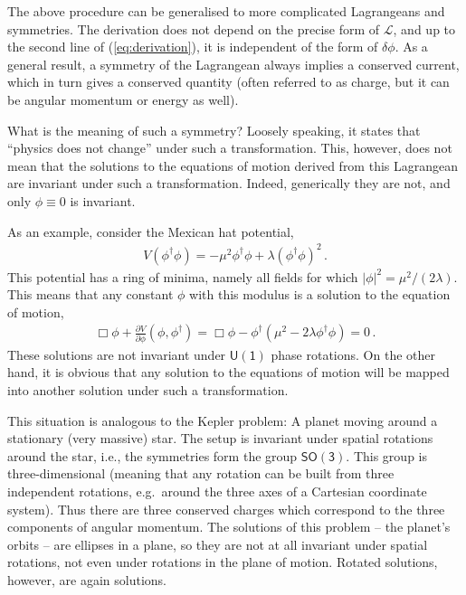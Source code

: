 \documentclass[12pt]{report}
\renewcommand{\L}{\ensuremath{\mathscr{L}}}
\newcommand{\2}{\ensuremath{\sqrt{2}\,}}
\renewcommand{\L}{\ensuremath{\mathscr{L}}}
\begin{document}
{      The above procedure can be generalised to more complicated Lagrangeans and
      symmetries. The derivation does not depend on the precise form of $\L$, and up to the second
      line of (\ref{eq:derivation}), it is independent of the form of $\delta \phi$. As a general
      result, a symmetry of the Lagrangean always implies a conserved current, which in turn gives a
      conserved quantity (often referred to as charge, but it can be angular momentum or energy as
      well). 
      
      What is the meaning of such a symmetry? Loosely speaking, it states that ``physics does not
      change'' under such a transformation. This, however, does not mean that the solutions to the
      equations of motion derived from this Lagrangean are invariant under such a
      transformation. Indeed, generically they are not, and only $\phi\equiv 0$ is invariant.

      As an example, consider the Mexican hat potential,
      \begin{align}
        V(\phi^\dagger\phi)=-\mu^2 \phi^\dagger\phi +\lambda\left(\phi^\dagger\phi\right)^2\,.
      \end{align}
      This potential has a ring of minima, namely all fields for which
      $\left|\phi\right|^2=\mu^2/(2\lambda)$. This means that any constant $\phi$ with this modulus
      is a solution to the equation of motion,  
      \begin{align}
        \Box \phi +\frac{\partial V}{\partial \phi}\! \left(\phi,\phi^\dagger\right) = \Box \phi -\phi^\dagger
        \left(\mu^2-2\lambda\phi^\dagger\phi \right)=0\,.
      \end{align}
      These solutions are not invariant under $\mathsf{U(1)}$ phase rotations. On the other hand,
      it is obvious that any solution to the equations of motion will be mapped into another
      solution under such a transformation.
      
      This situation is analogous to the Kepler problem: A planet moving
      around a stationary 
      (very massive) star. The setup is invariant under spatial rotations around the star, i.e., the
      symmetries form the group $\mathsf{SO(3)}$. This group is three-dimensional 
      (meaning that any rotation can be built from three independent rotations, e.g.\ around the
      three axes of a Cartesian coordinate system). Thus there are three conserved charges
      which correspond to the three components of angular momentum. The
      solutions of this problem -- the planet's orbits -- are ellipses in a plane, so they are not
      at all invariant under spatial rotations, not even under rotations in the plane of
      motion. Rotated solutions, however, are again solutions.
      
}
\end{document}
